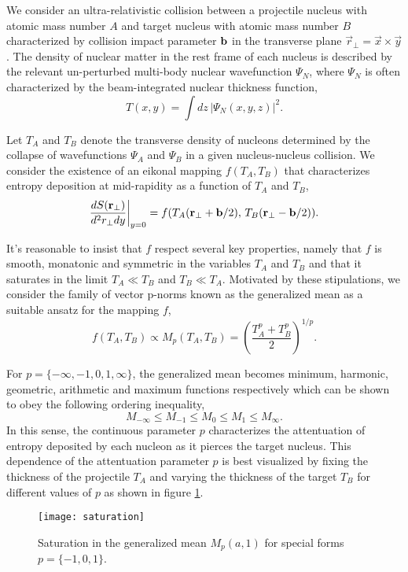 \documentclass[aps,prl,reprint,amsmath,nofootinbib]{revtex4-1}
\begin{document}
We consider an ultra-relativistic collision between a projectile nucleus with atomic mass number $A$ and target nucleus with atomic mass number $B$ characterized 
by collision impact parameter ${\bf b}$ in the transverse plane $\vec{r}_\perp = \vec{x} \times \vec{y}$. The density of nuclear matter in the rest frame of each 
nucleus is described by the relevant un-perturbed multi-body nuclear wavefunction $\Psi_N$, where $\Psi_N$ is often characterized by the beam-integrated 
nuclear thickness function,
\begin{equation}
 T(x,y) = \int dz\, \left|\Psi_N(x,y,z) \right|^2. 
\end{equation}

Let $T_A$ and $T_B$ denote the transverse density of nucleons determined by the collapse of wavefunctions $\Psi_A$ and $\Psi_B$ in a given nucleus-nucleus 
collision. We consider the existence of an eikonal mapping $f(T_A,T_B)$ that characterizes entropy deposition at mid-rapidity as a function of $T_A$ and $T_B$,
\begin{equation}
  \label{ansatz}
  \frac{dS({\bf r}_\perp)}{d^2r_\perp dy} \biggr \rvert_{y=0}  = f(T_A({\bf r}_\perp + {\bf b}/2),\,T_B({\bf r}_\perp - {\bf b}/2)).
\end{equation}

It's reasonable to insist that $f$ respect several key properties, namely that $f$ is smooth, monatonic and symmetric in the variables $T_A$ and 
$T_B$ and that it saturates in the limit $T_A \ll T_B$ and $T_B \ll T_A$. Motivated by these stipulations, we consider the family of vector p-norms 
known as the generalized mean as a suitable ansatz for the mapping $f$,
\begin{equation}
 \label{generalized mean ansatz}
 f(T_A, T_B) \propto M_p(T_A,T_B) = \left( \frac{T_A^p + T_B^p}{2} \right)^{1/p}.
\end{equation}

For $p = \{-\infty,-1,0,1,\infty\}$, the generalized mean becomes minimum, harmonic, geometric, arithmetic and maximum functions respectively which can be shown
to obey the following ordering inequality, 
\begin{equation}
 M_{-\infty} \le M_{-1} \le M_{0} \le M_{1} \le M_{\infty}.
\end{equation}
In this sense, the continuous parameter $p$ characterizes the attentuation of entropy deposited by each nucleon as it pierces the target nucleus. This 
dependence of the attentuation parameter  $p$ is best visualized by fixing the thickness of the projectile $T_A$ and varying the thickness of the target 
$T_B$ for different values of $p$ as shown in figure \ref{saturation}.
\begin{figure}[b]
 \texttt{[image: saturation]}
 \caption{\label{saturation}Saturation in the generalized mean $M_p(a, 1)$ for special forms $p=\{-1, 0, 1\}$.}
\end{figure}
\end{document}
